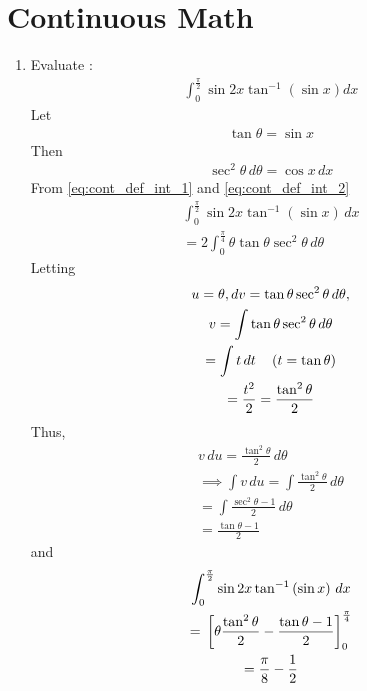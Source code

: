 \documentclass[journal,12pt,twocolumn]{IEEEtran}
\renewcommand\thesection{\arabic{section}}
\begin{document}
\section{Continuous Math}
\renewcommand{\theequation}{\theenumi}
\begin{enumerate}[label=\thesection.\arabic*.,ref=\thesection.\theenumi]
 \item Evaluate : \begin{align} \int_{0}^{\frac{\pi}{2}} \sin2x \tan^{-1}  \left(\sin x\right)dx \nonumber \end{align}
		 \solution Let 
		 \begin{align}
			 \label{eq:cont_def_int_1}
			 \tan \theta = \sin x
		 \end{align}
		 Then 
		 \begin{align}
			 \label{eq:cont_def_int_2}
			 \sec^2  \theta \, d\theta= \cos x \, dx
		 \end{align}
			 From \eqref{eq:cont_def_int_1} and 
			 \eqref{eq:cont_def_int_2}
 \begin{multline} 
 \int_{0}^{\frac{\pi}{2}} \sin2x \tan^{-1}  \left(\sin x\right)\, dx  
 \\
	 =
2 \int_{0}^{\frac{\pi}{4}}  \theta \tan \theta \sec^2\theta \, d\theta
 \end{multline}
 Letting 
 \begin{multline} 
	 u = \theta , dv = \tan \theta \sec^2\theta \, d\theta, 
	 \\
	 v = \int \tan \theta \sec^2\theta \, d\theta 
	 \\
	  = \int t \, dt \quad \left(t = \tan \theta \right)
	  \\
	  = \frac{t^2}{2} = \frac{\tan^2 \theta }{2}
 \end{multline}
 Thus, 
 \begin{multline} 
v\,du 
	 =   \frac{\tan^2\theta }{2}\, d\theta
	 \\
	 \implies \int v\, du = \int \frac{\tan^2\theta }{2}\, d\theta
	 \\
	 = \int \frac{\sec^2\theta -1 }{2}\, d\theta
	 \\
	 =  \frac{\tan \theta - 1}{2}
 \end{multline}
 and
 \begin{multline} 
 \int_{0}^{\frac{\pi}{2}} \sin2x \tan^{-1}  \left(\sin x\right)\, dx  
 \\
	 = {}\left[\theta \frac{\tan^2\theta}{2} -  \frac{\tan \theta - 1}{2} \right]_{0}^{\frac{\pi}{4}}
	 \\
	 = \frac{\pi}{8} - \frac{1}{2}
 \end{multline}


\end{enumerate}
\end{document}
